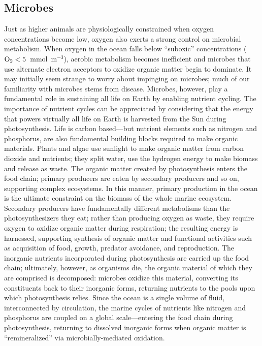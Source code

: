 \documentclass[draft,linenumbers]{report_chapter}
\begin{document}
\subsection{Microbes}

Just as higher animals are physiologically constrained when oxygen concentrations become low, oxygen also exerts a strong control on microbial metabolism.
When oxygen in the ocean falls below ``suboxic'' concentrations ($\ce{O2} < 5$~mmol~m$^{-3}$), aerobic metabolism becomes inefficient and microbes that use alternate electron acceptors to oxidize organic matter begin to dominate.
It may initially seem strange to worry about impinging on microbes; much of our familiarity with microbes stems from disease.
Microbes, however, play a fundamental role in sustaining all life on Earth by enabling nutrient cycling.
The importance of nutrient cycles can be appreciated by considering that the energy that powers virtually all life on Earth is harvested from the Sun during photosynthesis.
Life is carbon based---but nutrient elements such as nitrogen and phosphorus, are also fundamental building blocks required to make organic materials.
Plants and algae use sunlight to make organic matter from carbon dioxide and nutrients; they split water, use the hydrogen energy to make biomass and release  as waste.
The organic matter created by photosynthesis enters the food chain; primary producers are eaten by secondary producers and so on, supporting complex ecosystems.
In this manner, primary production in the ocean is the ultimate constraint on the biomass of the whole marine ecosystem.
Secondary producers have fundamentally different metabolisms than the photosynthesizers they eat; rather than producing oxygen as waste, they require oxygen to oxidize organic matter during respiration; the resulting energy is harnessed, supporting synthesis of organic matter and functional activities such as acquisition of food, growth, predator avoidance, and reproduction.
The inorganic nutrients incorporated during photosynthesis are carried up the food chain; ultimately, however, as organisms die, the organic material of which they are comprised is decomposed: microbes oxidize this material, converting its constituents back to their inorganic forms, returning nutrients to the pools upon which photosynthesis relies.
Since the ocean is a single volume of fluid, interconnected by circulation, the marine cycles of nutrients like nitrogen and phosphorus are coupled on a global scale---entering the food chain during photosynthesis, returning to dissolved inorganic forms when organic matter is ``remineralized'' via microbially-mediated oxidation.
\end{document}
